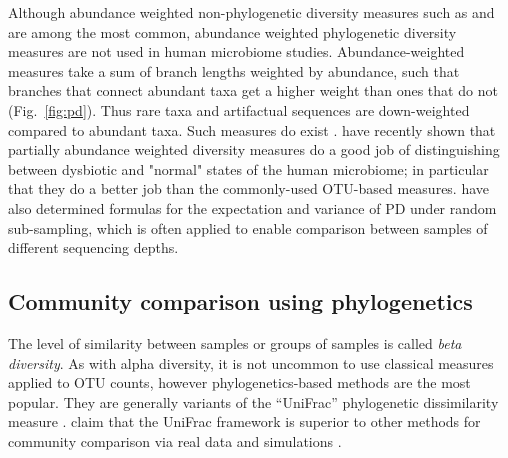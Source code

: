 \documentclass{amsart}
\begin{document}
Although abundance weighted non-phylogenetic diversity measures such as \citet{simpson1949measurement} and \citet{shannon1948mathematical} are among the most common, abundance weighted phylogenetic diversity measures are not used in human microbiome studies.
Abundance-weighted measures take a sum of branch lengths weighted by abundance, such that branches that connect abundant taxa get a higher weight than ones that do not (Fig.~\ref{fig:pd}).
Thus rare taxa and artifactual sequences are down-weighted compared to abundant taxa.
Such measures do exist \citep{rao1982diversity,barker2002phylogenetic,allen2009new,chao2010phylogenetic,vellend2011measuring}.
\citet{mccoy2013abundance} have recently shown that partially abundance weighted diversity measures do a good job of distinguishing between dysbiotic and "normal" states of the human microbiome; in particular that they do a better job than the commonly-used OTU-based measures.
\citet{nipperess2013mean} have also determined formulas for the expectation and variance of PD under random sub-sampling, which is often applied to enable comparison between samples of different sequencing depths.


\subsection{Community comparison using phylogenetics}

The level of similarity between samples or groups of samples is called \emph{beta diversity}.
As with alpha diversity, it is not uncommon to use classical measures \citep[e.g.][]{jaccard1908nouvelles} applied to OTU counts, however phylogenetics-based methods are the most popular.
They are generally variants of the ``UniFrac'' phylogenetic dissimilarity measure \citep[as described and named by][]{LozuponeKnightUniFrac05}.
\citet{kuczynski2010microbial} claim that the UniFrac framework is superior to other methods for community comparison via real data and simulations \citep[for a contrary viewpoint using simulations see][]{schloss2008evaluating}.
\end{document}
